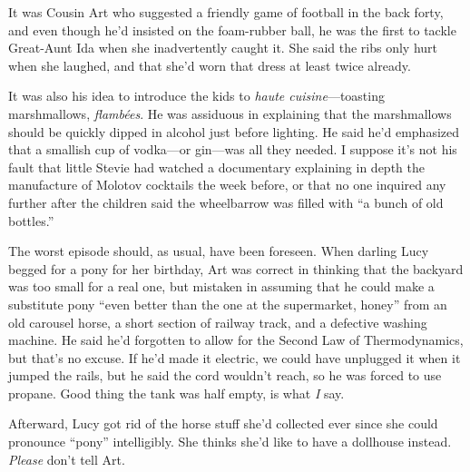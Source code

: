 
It was Cousin Art who suggested a friendly game of football in the back
forty, and even though he'd insisted on the foam-rubber ball, he was the
first to tackle Great-Aunt Ida when she inadvertently caught it. She
said the ribs only hurt when she laughed, and that she'd worn that dress
at least twice already.

It was also his idea to introduce the kids to \emph{haute
cuisine}---toasting marshmallows, \emph{flambées}. He was assiduous in
explaining that the marshmallows should be quickly dipped in alcohol
just before lighting. He said he'd emphasized that a smallish cup of
vodka---or gin---was all they needed. I suppose it's not his fault that
little Stevie had watched a documentary explaining in depth the
manufacture of Molotov cocktails the week before, or that no one
inquired any further after the children said the wheelbarrow was filled
with ``a bunch of old bottles.''

The worst episode should, as usual, have been foreseen. When darling
Lucy begged for a pony for her birthday, Art was correct in thinking
that the backyard was too small for a real one, but mistaken in assuming
that he could make a substitute pony ``even better than the one at the
supermarket, honey'' from an old carousel horse, a short section of
railway track, and a defective washing machine. He said he'd forgotten
to allow for the Second Law of Thermodynamics, but that's no excuse. If
he'd made it electric, we could have unplugged it when it jumped the
rails, but he said the cord wouldn't reach, so he was forced to use
propane. Good thing the tank was half empty, is what \emph{I} say.

Afterward, Lucy got rid of the horse stuff she'd collected ever since
she could pronounce ``pony'' intelligibly. She thinks she'd like to have
a dollhouse instead. \emph{Please} don't tell Art.

